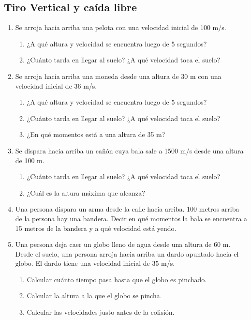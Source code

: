\newpage
\subsection{Tiro Vertical y caída libre}

\begin{enumerate}
\item Se arroja hacia arriba una pelota con una velocidad inicial de 100 m/s. 
\begin{enumerate}
    \item ¿A qué altura y velocidad se encuentra luego de 5 segundos? %

    \item ¿Cuánto tarda en llegar al suelo?  ¿A qué velocidad toca el suelo? %
\end{enumerate}

\item Se arroja hacia arriba una moneda desde una altura de 30 m con una velocidad inicial de 36 m/s. 
\begin{enumerate}
    \item ¿A qué altura y velocidad se encuentra luego de 5 segundos?

    \item ¿Cuánto tarda en llegar al suelo?  ¿A qué velocidad toca el suelo?

    \item ¿En qué momentos está a una altura de 35 m?
\end{enumerate}

\item Se dispara hacia arriba un cañón cuya bala sale a 1500 m/s desde una altura de 100 m. 
\begin{enumerate}
    \item ¿Cuánto tarda en llegar al suelo?  ¿A qué velocidad toca el suelo? %

    \item ¿Cuál es la altura máxima que alcanza?
\end{enumerate}

\item Una persona dispara un arma desde la calle hacia arriba. 100 metros arriba de la persona hay una bandera. Decir en qué momentos la bala se encuentra a 15 metros de la bandera y a qué velocidad está yendo.

\item Una persona deja caer un globo lleno de agua desde una altura de 60 m. Desde
el suelo, una persona arroja hacia arriba
un dardo apuntado hacia el globo. El dardo tiene una velocidad inicial de 35 m/s.
\begin{enumerate}
    \item Calcular cuánto tiempo pasa hasta que el
    globo es pinchado.
    \item Calcular la altura a la que el globo se pincha.
    \item Calcular las velocidades justo antes de la colisión.
\end{enumerate}


\end{enumerate}
